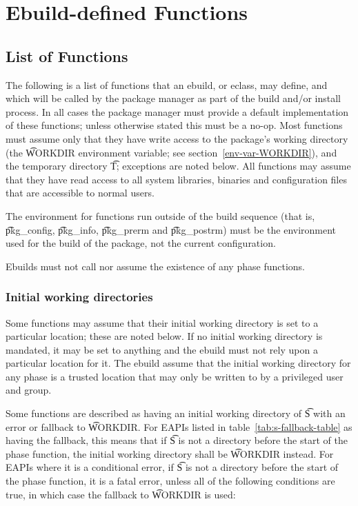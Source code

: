 \chapter{Ebuild-defined Functions}
\label{sec:ebuild-functions}

\section{List of Functions}

The following is a list of functions that an ebuild, or eclass, may define, and which will be called
by the package manager as part of the build and/or install process. In all cases the package manager
must provide a default implementation of these functions; unless otherwise stated this must be a
no-op. Most functions must assume only that they have write access to the package's working
directory (the \t{WORKDIR} environment variable; see section~\ref{env-var-WORKDIR}), and the
temporary directory \t{T}; exceptions are noted below. All functions may assume that they have read
access to all system libraries, binaries and configuration files that are accessible to normal
users.

The environment for functions run outside of the build sequence (that is, \t{pkg_config},
\t{pkg_info}, \t{pkg_prerm} and \t{pkg_postrm}) must be the environment used for the build of the
package, not the current configuration.

Ebuilds must not call nor assume the existence of any phase functions.

\subsection{Initial working directories}
\label{sec:s-to-workdir-fallback}

Some functions may assume that their initial working directory is set to a particular location;
these are noted below. If no initial working directory is mandated, it may be set to anything and
the ebuild must not rely upon a particular location for it. The ebuild  assume that the
initial working directory for any phase is a trusted location that may only be written to by a
privileged user and group.

 Some functions are described as having an initial working
directory of \t{S} with an error or fallback to \t{WORKDIR}\@. For EAPIs listed in
table~\ref{tab:s-fallback-table} as having the fallback, this means that if \t{S} is not a directory
before the start of the phase function, the initial working directory shall be \t{WORKDIR} instead.
For EAPIs where it is a conditional error, if \t{S} is not a directory before the start of the phase
function, it is a fatal error, unless all of the following conditions are true, in which case the
fallback to \t{WORKDIR} is used:

